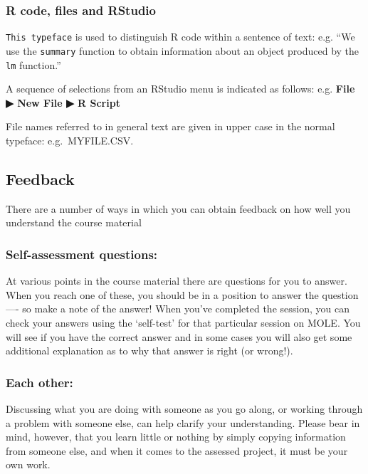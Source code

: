 \documentclass[]{book}
\begin{document}
\subsubsection{R code, files and
RStudio}\label{r-code-files-and-rstudio}

\texttt{This\ typeface} is used to distinguish R code within a sentence
of text: e.g. ``We use the \texttt{summary} function to obtain
information about an object produced by the \texttt{lm} function.''

A sequence of selections from an RStudio menu is indicated as follows:
e.g. \textbf{File ▶ New File ▶ R Script}

File names referred to in general text are given in upper case in the
normal typeface: e.g.~MYFILE.CSV.

\subsection{Feedback}\label{feedback}

There are a number of ways in which you can obtain feedback on how well
you understand the course material

\subsubsection{Self-assessment
questions:}\label{self-assessment-questions}

At various points in the course material there are questions for you to
answer. When you reach one of these, you should be in a position to
answer the question ---- so make a note of the answer! When you've
completed the session, you can check your answers using the `self-test'
for that particular session on MOLE. You will see if you have the
correct answer and in some cases you will also get some additional
explanation as to why that answer is right (or wrong!).

\subsubsection{Each other:}\label{each-other}

Discussing what you are doing with someone as you go along, or working
through a problem with someone else, can help clarify your
understanding. Please bear in mind, however, that you learn little or
nothing by simply copying information from someone else, and when it
comes to the assessed project, it must be your own work.
\end{document}
